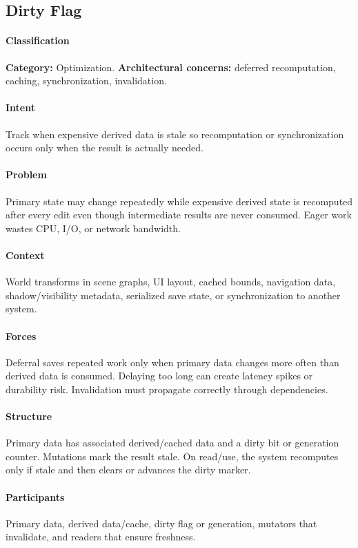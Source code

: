 \documentclass[11pt]{article}
\begin{document}
\subsection{Dirty Flag}\label{pat:dirty-flag}
\paragraph{Classification} \textbf{Category:} Optimization. \textbf{Architectural concerns:} deferred recomputation, caching, synchronization, invalidation.
\paragraph{Intent} Track when expensive derived data is stale so recomputation or synchronization occurs only when the result is actually needed.
\paragraph{Problem} Primary state may change repeatedly while expensive derived state is recomputed after every edit even though intermediate results are never consumed. Eager work wastes CPU, I/O, or network bandwidth.
\paragraph{Context} World transforms in scene graphs, UI layout, cached bounds, navigation data, shadow/visibility metadata, serialized save state, or synchronization to another system.
\paragraph{Forces} Deferral saves repeated work only when primary data changes more often than derived data is consumed. Delaying too long can create latency spikes or durability risk. Invalidation must propagate correctly through dependencies.
\paragraph{Structure} Primary data has associated derived/cached data and a dirty bit or generation counter. Mutations mark the result stale. On read/use, the system recomputes only if stale and then clears or advances the dirty marker.
\paragraph{Participants} Primary data, derived data/cache, dirty flag or generation, mutators that invalidate, and readers that ensure freshness.
\end{document}

